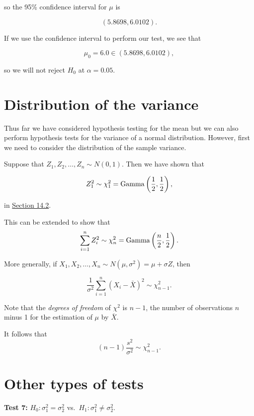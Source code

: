 \documentclass[
]{book}
\begin{document}
so the 95\% confidence interval for \(\mu\) is

\[(5.8698, 6.0102).\]

If we use the confidence interval to perform our test, we see that

\[\mu_0 = 6.0 \in (5.8698, 6.0102),\]

so we will not reject \(H_0\) at \(\alpha =0.05\).

\hfill\break

\hypertarget{Sec_Hypo_Test:variance}{%
\section{Distribution of the variance}\label{Sec_Hypo_Test:variance}}

Thus far we have considered hypothesis testing for the mean but we can also perform hypothesis tests for the variance of a normal distribution. However, first we need to consider the distribution of the sample variance.

Suppose that \(Z_1, Z_2, \ldots, Z_n \sim N(0,1)\). Then we have shown that

\[ Z_1^2 \sim \chi^2_1 = {\rm Gamma} \left( \frac{1}{2}, \frac{1}{2} \right),\]

in \protect\hyperlink{Transform:univariate}{Section 14.2}.

This can be extended to show that\\

\[ \sum_{i=1}^n Z_i^2 \sim \chi^2_n = {\rm Gamma} \left( \frac{n}{2}, \frac{1}{2} \right).\]

More generally, if \(X_1, X_2, \ldots, X_n \sim N(\mu, \sigma^2) = \mu + \sigma Z\), then

\[ \frac{1}{\sigma^2} \sum_{i=1}^n \left( X_i - \bar{X}\right)^2 \sim \chi_{n-1}^2. \]

Note that the \emph{degrees of freedom} of \(\chi^2\) is \(n-1\), the number of observations \(n\) minus 1 for the estimation of \(\mu\) by \(\bar{X}\).

It follows that\\

\[ (n-1) \frac{s^2}{\sigma^2}  \sim \chi^2_{n-1}.\]

\hypertarget{Sec_Hypo_Test:other}{%
\section{Other types of tests}\label{Sec_Hypo_Test:other}}

\leavevmode{}%
{\textbf{Test 7:}} \(H_0: \sigma_1^2 = \sigma_2^2\) vs.~\(H_1: \sigma_1^2 \neq \sigma_2^2\).
\end{document}
